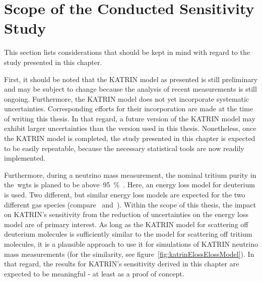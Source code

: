 \section{Scope of the Conducted Sensitivity Study}
\label{sec:katrinElossValidity}
This section lists considerations that should be kept in mind with regard to the study presented in this chapter.

First, it should be noted that the KATRIN model as presented is still preliminary and may be subject to change because the analysis of recent measurements is still ongoing. Furthermore, the KATRIN model does not yet incorporate systematic uncertainties. Corresponding efforts for their incorporation are made at the time of writing this thesis. In that regard, a future version of the KATRIN model may exhibit larger uncertainties than the version used in this thesis. Nonetheless, once the KATRIN model is completed, the study presented in this chapter is expected to be easily repeatable, because the necessary statistical tools are now readily implemented.

Furthermore, during a neutrino mass measurement, the nominal tritium purity in the~\gls{wgts} is planed to be above~\SI{95}{\percent}~\cite{Angrik:2005ep}. Here, an energy loss model for deuterium is used. Two different, but similar energy loss models are expected for the two different gas species (compare~\cite{Abdurashitov2017} and~\cite{Aseev2000}). Within the scope of this thesis, the impact on KATRIN's sensitivity from the reduction of uncertainties on the energy loss model are of primary interest. As long as the KATRIN model for scattering off deuterium molecules is sufficiently similar to the model for scattering off tritium molecules, it is a plausible approach to use it for simulations of KATRIN neutrino mass measurements (for the similarity, see figure~\ref{fig:katrinElossElossModel}). In that regard, the results for KATRIN's sensitivity derived in this chapter are expected to be meaningful - at least as a proof of concept.
\FloatBarrier


\def\currentRootFolder{chapter/sensitivityStudyWithPreliminaryKatrinElossModel}
\def\currentFigureFolder{\currentRootFolder/fig}
\FloatBarrier
